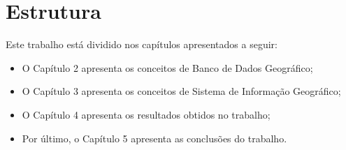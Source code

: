 \section{Estrutura}

Este trabalho está dividido nos capítulos apresentados a seguir:

\begin{itemize}
\item O Capítulo 2 apresenta os conceitos de Banco de Dados Geográfico;
\item O Capítulo 3 apresenta os conceitos de Sistema de Informação Geográfico;
\item O Capítulo 4 apresenta os resultados obtidos no trabalho;
\item Por último, o Capítulo 5 apresenta as conclusões do trabalho.
\end{itemize}